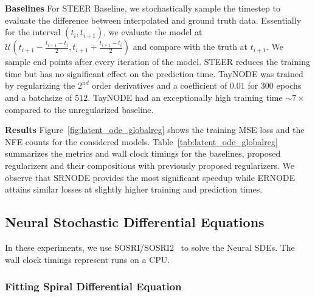 \textbf{Baselines} For STEER Baseline, we stochastically sample the timestep to evaluate the difference between interpolated and ground truth data. Essentially for the interval $(t_i, t_{i + 1})$, we evaluate the model at $\mathcal{U}(t_{i + 1} - \frac{t_{i + 1} - t_i}{2}, t_{i + 1} + \frac{t_{i + 1} - t_i}{2})$ and compare with the truth at $t_{i + 1}$. We sample end points after every iteration of the model. STEER reduces the training time but has no significant effect on the prediction time. TayNODE was trained by regularizing the $2^{nd}$ order derivatives and a coefficient of $0.01$ for 300 epochs and a batchsize of $512$. TayNODE had an exceptionally high training time $\sim 7\times$ compared to the unregularized baseline.

\textbf{Results} Figure~\ref{fig:latent_ode_globalreg} shows the training MSE loss and the NFE counts for the considered models. Table~\ref{tab:latent_ode_globalreg} summarizes the metrics and wall clock timings for the baselines, proposed regularizers and their compositions with previously proposed regularizers. We observe that SRNODE provides the most significant speedup while ERNODE attains similar losses at slightly higher training and prediction times.

\subsection{Neural Stochastic Differential Equations}

In these experiments, we use SOSRI/SOSRI2~\citep{rackauckas2020sosri} to solve the Neural SDEs. The wall clock timings represent runs on a CPU.

\subsubsection{Fitting Spiral Differential Equation}
\label{subsec:fitneuralsde}

